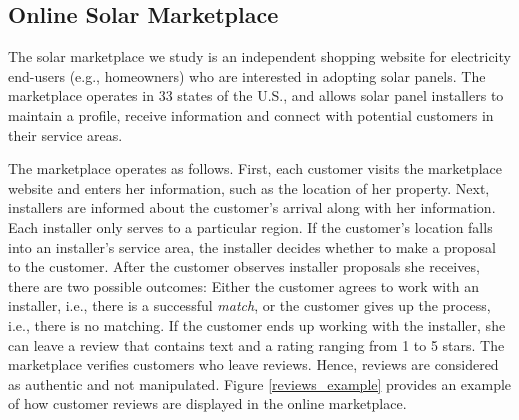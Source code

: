 \documentclass[msom,blindrev]{informs3}
\begin{document}
	
	
	
	
	
	\subsection{Online Solar Marketplace}
	
	The solar marketplace we study is an independent shopping website for electricity end-users (e.g., homeowners) who are interested in adopting solar panels.  The marketplace operates in 33 states of the U.S., and allows solar panel installers to maintain a profile, receive information and connect with potential customers in their service areas.
	
	The marketplace operates as follows. First, each customer visits the marketplace website and enters her information, such as the location of her property. Next, installers are informed about the customer's arrival along with her information.  Each installer only serves to a particular region. If the customer's location falls into an installer's service area, the installer decides whether to make a proposal to the customer. After the customer observes installer proposals she receives, there are two possible outcomes: Either the customer agrees to work with an installer, i.e., there is a successful \emph{match}, or the customer gives up the process, i.e., there is no matching. If the customer ends up working with the installer, she can leave a review that contains text and a rating ranging from 1 to 5 stars. The marketplace verifies customers who leave reviews. Hence, reviews are considered as authentic and not manipulated. Figure \ref{reviews_example} provides an example of how customer reviews are displayed in the online marketplace.
	
\end{document}
